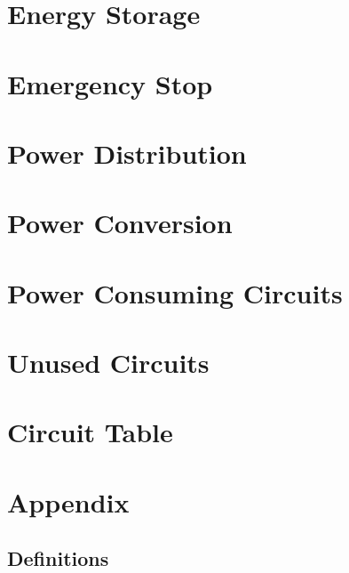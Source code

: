     




\section{Energy Storage}

\section{Emergency Stop}

\section{Power Distribution}

\section{Power Conversion}

\section{Power Consuming Circuits}

\section{Unused Circuits}

\section{Circuit Table}

\section{Appendix}

    \subsection{Definitions}

